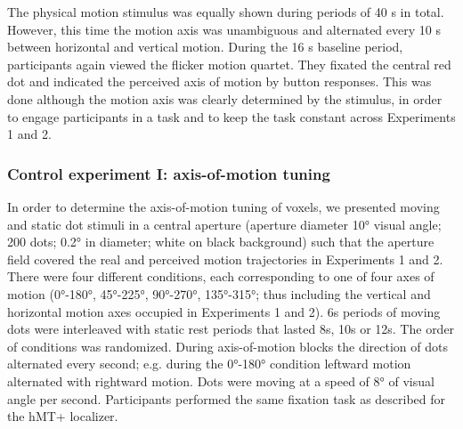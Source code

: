 The physical motion stimulus was equally shown during periods of 40 s in total. However, this time the motion axis was unambiguous and alternated every 10 s between horizontal and vertical motion. During the 16 s baseline period, participants again viewed the flicker motion quartet. They fixated the central red dot and indicated the perceived axis of motion by button responses. This was done although the motion axis was clearly determined by the stimulus, in order to engage participants in a task and to keep the task constant across Experiments 1 and 2.

\subsubsection{Control experiment I: axis-of-motion tuning}
In order to determine the axis-of-motion tuning of voxels, we presented moving and static dot stimuli in a central aperture (aperture diameter 10° visual angle; 200 dots; 0.2° in diameter; white on black background) such that the aperture field covered the real and perceived motion trajectories in Experiments 1 and 2. There were four different conditions, each corresponding to one of four axes of motion (0°-180°, 45°-225°, 90°-270°, 135°-315°; thus including the vertical and horizontal motion axes occupied in Experiments 1 and 2). 6s periods of moving dots were interleaved with static rest periods that lasted 8s, 10s or 12s. The order of conditions was randomized. During axis-of-motion blocks the direction of dots alternated every second; e.g. during the 0°-180° condition leftward motion alternated with rightward motion. Dots were moving at a speed of 8° of visual angle per second. Participants performed the same fixation task as described for the hMT+ localizer.

